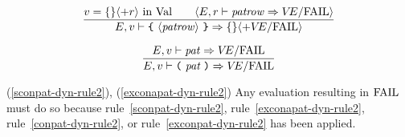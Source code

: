 \replacement{\theidstatus}{\begin{equation}        %
\frac{\E(\longexn)=\V}
     {\E,\V\ts\longexn\ra\emptymap}
\end{equation}}{\begin{equation}        %
\frac{\E(\longvid)=(\V,\is)\qquad\is\neq\isv}
     {\E,\V\ts\longvid\ra\emptymap}
\end{equation}}
\oldpagebreak
{}


\begin{equation}	%
\frac{\V=\emptymap\langle+\r\rangle\ \In\ \Val\qquad
      \langle\E,\r\ts\labpats\ra\VE/\fail\rangle}
     {\E,\V\ts\lttbrace\ \langle\labpats\rangle\ \rttbrace\ra\emptymap\langle+\VE/\fail\rangle}
\end{equation}

\begin{equation}	%
\frac{\E,\V\ts\pat\ra\VE/\fail}
     {\E,\V\ts\parpat\ra\VE/\fail}\index{56.1}
\end{equation}

\comments
\begin{description}
\item{(\ref{sconpat-dyn-rule2}),
\deletion{\theidstatus}{(\ref{conapat-dyn-rule2}),}
(\ref{exconapat-dyn-rule2})}
  Any evaluation resulting in ${\rm FAIL}$ must do so because
rule~\ref{sconpat-dyn-rule2},
rule~\ref{exconapat-dyn-rule2},
rule~\ref{conpat-dyn-rule2},
or rule~\ref{exconpat-dyn-rule2} has been
applied.
\end{description}

